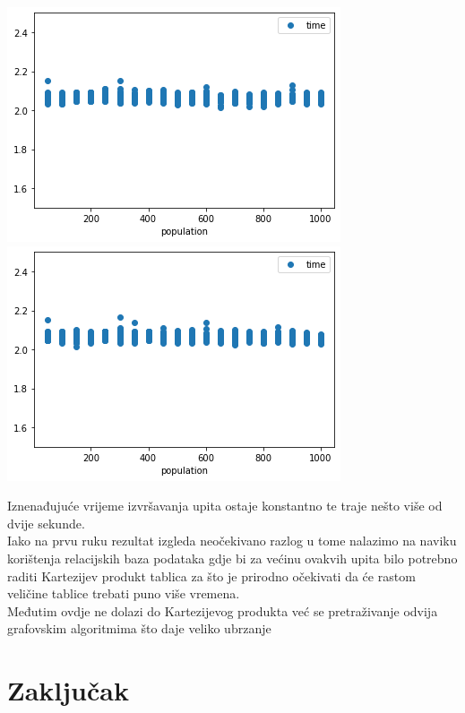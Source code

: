 \documentclass[titlepage, 12pt]{scrartcl}
\begin{document}
\begin{center}
    \includegraphics[scale=0.5]{slike/personal_graph.png}
    \includegraphics[scale=0.5]{slike/business_graph.png}
\end{center}


Iznenađujuće vrijeme izvršavanja upita ostaje konstantno te traje nešto više od dvije sekunde. \\
Iako na prvu ruku rezultat izgleda neočekivano razlog u tome nalazimo na naviku korištenja relacijskih baza podataka gdje bi za većinu ovakvih upita bilo potrebno raditi Kartezijev produkt tablica za što je prirodno očekivati da će rastom veličine tablice trebati puno više vremena. \\
Međutim ovdje ne dolazi do Kartezijevog produkta već se pretraživanje odvija grafovskim algoritmima što daje veliko ubrzanje 


\newpage
\section{Zaključak}
\end{document}
